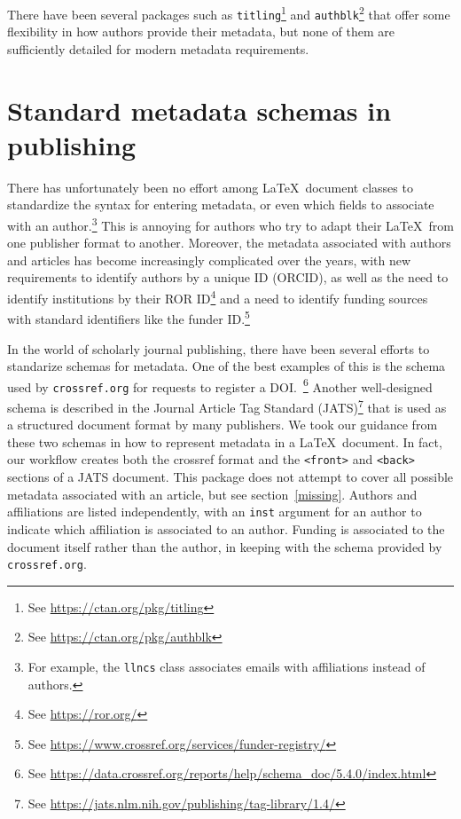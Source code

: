 \documentclass{article}
\newcommand{\pkg}[1]{\texttt{#1}}
\begin{document}
There have been several packages such
as \pkg{titling}\footnote{See \url{https://ctan.org/pkg/titling}}
and \pkg{authblk}\footnote{See \url{https://ctan.org/pkg/authblk}}
that offer some flexibility in how authors provide their metadata, but
none of them are sufficiently detailed for modern metadata
requirements.

\section{Standard metadata schemas in publishing}
There has unfortunately been no effort among \LaTeX\ document classes
to standardize the syntax for entering metadata, or even which fields
to associate with an author.\footnote{For example, the \pkg{llncs}
class associates emails with affiliations instead of authors.}
This is annoying for authors who try to adapt their \LaTeX\ from one
publisher format to another. Moreover, the metadata associated with authors
and articles has become increasingly complicated over the years, with
new requirements to identify authors by a unique ID (ORCID), as well
as the need to identify institutions by their ROR ID\footnote{See \url{https://ror.org/}}
and a need to identify funding sources with standard identifiers like the
funder ID.\footnote{See \url{https://www.crossref.org/services/funder-registry/}}

In the world of scholarly journal publishing, there have been several efforts to
standarize schemas for metadata. One of the best examples
of this is the schema used by \texttt{crossref.org} for requests to
register a DOI.~\footnote{See
\url{https://data.crossref.org/reports/help/schema_doc/5.4.0/index.html}}
Another well-designed schema is described in the Journal Article Tag
Standard
(JATS)\footnote{See \url{https://jats.nlm.nih.gov/publishing/tag-library/1.4/}}
that is used as a structured document format by many publishers. We
took our guidance from these two schemas in how to represent metadata
in a \LaTeX\ document. In fact, our workflow creates both the crossref
format and the \texttt{<front>} and \texttt{<back>} sections of a JATS
document.  This package does not attempt to cover all possible
metadata associated with an article, but see
section~\ref{missing}. Authors and affiliations are listed
independently, with an \texttt{inst} argument for an author to indicate which
affiliation is associated to an author. Funding is associated to the
document itself rather than the author, in keeping with the schema
provided by \texttt{crossref.org}.
\end{document}
